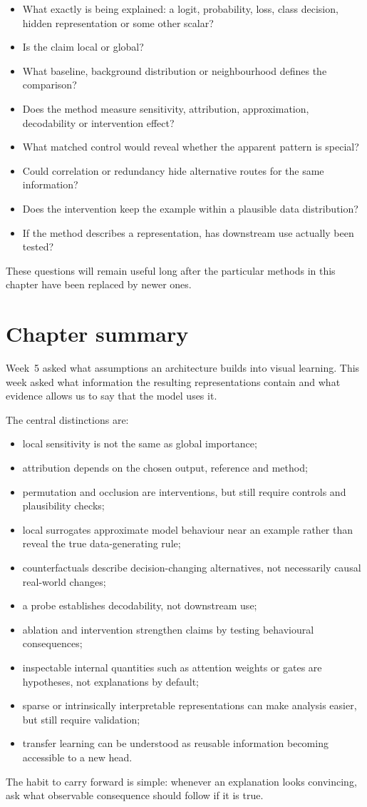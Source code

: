 \begin{itemize}[leftmargin=*]
  \item What exactly is being explained: a logit, probability, loss, class decision, hidden representation or some other scalar?
  \item Is the claim local or global?
  \item What baseline, background distribution or neighbourhood defines the comparison?
  \item Does the method measure sensitivity, attribution, approximation, decodability or intervention effect?
  \item What matched control would reveal whether the apparent pattern is special?
  \item Could correlation or redundancy hide alternative routes for the same information?
  \item Does the intervention keep the example within a plausible data distribution?
  \item If the method describes a representation, has downstream use actually been tested?
\end{itemize}

These questions will remain useful long after the particular methods in this chapter have been replaced by newer ones.

\section{Chapter summary}

Week~5 asked what assumptions an architecture builds into visual learning. This week asked what information the resulting representations contain and what evidence allows us to say that the model uses it.

The central distinctions are:
\begin{itemize}[leftmargin=*]
  \item local sensitivity is not the same as global importance;
  \item attribution depends on the chosen output, reference and method;
  \item permutation and occlusion are interventions, but still require controls and plausibility checks;
  \item local surrogates approximate model behaviour near an example rather than reveal the true data-generating rule;
  \item counterfactuals describe decision-changing alternatives, not necessarily causal real-world changes;
  \item a probe establishes decodability, not downstream use;
  \item ablation and intervention strengthen claims by testing behavioural consequences;
  \item inspectable internal quantities such as attention weights or gates are hypotheses, not explanations by default;
  \item sparse or intrinsically interpretable representations can make analysis easier, but still require validation;
  \item transfer learning can be understood as reusable information becoming accessible to a new head.
\end{itemize}

The habit to carry forward is simple: whenever an explanation looks convincing, ask what observable consequence should follow if it is true.
